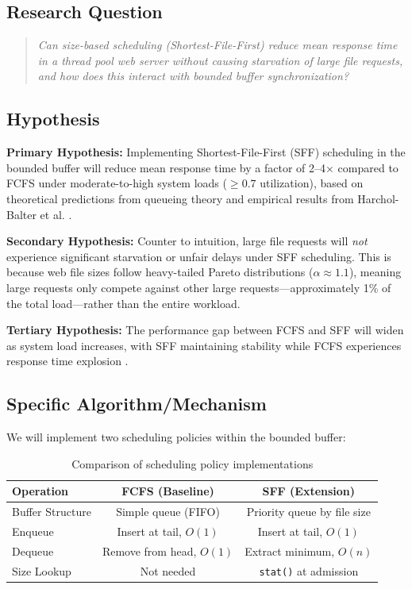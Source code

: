 \documentclass[11pt,a4paper]{article}
\begin{document}
\subsection{Research Question}

\begin{quote}
\textit{Can size-based scheduling (Shortest-File-First) reduce mean response time in a thread pool web server without causing starvation of large file requests, and how does this interact with bounded buffer synchronization?}
\end{quote}

\subsection{Hypothesis}
\noindent\textbf{Primary Hypothesis:} Implementing Shortest-File-First (SFF) scheduling in the bounded buffer will reduce mean response time by a factor of 2--4$\times$ compared to FCFS under moderate-to-high system loads ($\geq 0.7$ utilization), based on theoretical predictions from queueing theory and empirical results from Harchol-Balter et al. \cite{harchol2003}.

\vspace{0.5em}
\noindent\textbf{Secondary Hypothesis:} Counter to intuition, large file requests will \textit{not} experience significant starvation or unfair delays under SFF scheduling. This is because web file sizes follow heavy-tailed Pareto distributions ($\alpha \approx 1.1$), meaning large requests only compete against other large requests---approximately 1\% of the total load---rather than the entire workload.

\vspace{0.5em}
\noindent\textbf{Tertiary Hypothesis:} The performance gap between FCFS and SFF will widen as system load increases, with SFF maintaining stability while FCFS experiences response time explosion \cite{schroeder2006}.

\subsection{Specific Algorithm/Mechanism}

We will implement two scheduling policies within the bounded buffer:

\begin{table}[h!]
\centering
\begin{tabular}{@{}lcc@{}}
\toprule
\textbf{Operation} & \textbf{FCFS (Baseline)} & \textbf{SFF (Extension)} \\
\midrule
Buffer Structure & Simple queue (FIFO) & Priority queue by file size \\
Enqueue & Insert at tail, $O(1)$ & Insert at tail, $O(1)$ \\
Dequeue & Remove from head, $O(1)$ & Extract minimum, $O(n)$ \\
Size Lookup & Not needed & \texttt{stat()} at admission \\
\bottomrule
\end{tabular}
\caption{Comparison of scheduling policy implementations}
\end{table}
\end{document}
